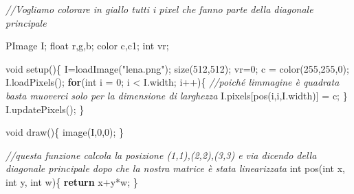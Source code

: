 \documentclass[
]{article}
\newenvironment{Shaded}{}{}
\newcommand{\CommentTok}[1]{\textcolor[rgb]{0.38,0.63,0.69}{\textit{#1}}}
\newcommand{\ControlFlowTok}[1]{\textcolor[rgb]{0.00,0.44,0.13}{\textbf{#1}}}
\newcommand{\DataTypeTok}[1]{\textcolor[rgb]{0.56,0.13,0.00}{#1}}
\newcommand{\DecValTok}[1]{\textcolor[rgb]{0.25,0.63,0.44}{#1}}
\newcommand{\FunctionTok}[1]{\textcolor[rgb]{0.02,0.16,0.49}{#1}}
\newcommand{\NormalTok}[1]{#1}
\newcommand{\OperatorTok}[1]{\textcolor[rgb]{0.40,0.40,0.40}{#1}}
\newcommand{\StringTok}[1]{\textcolor[rgb]{0.25,0.44,0.63}{#1}}
\begin{document}
\begin{Shaded}
\begin{Highlighting}[]
\CommentTok{//Vogliamo colorare in giallo tutti i pixel che fanno parte della diagonale principale}

\NormalTok{PImage I}\OperatorTok{;}
\DataTypeTok{float}\NormalTok{ r}\OperatorTok{,}\NormalTok{g}\OperatorTok{,}\NormalTok{b}\OperatorTok{;}
\NormalTok{color c}\OperatorTok{,}\NormalTok{c1}\OperatorTok{;}
\DataTypeTok{int}\NormalTok{ vr}\OperatorTok{;}

\DataTypeTok{void} \FunctionTok{setup}\OperatorTok{()\{}
\NormalTok{  I}\OperatorTok{=}\FunctionTok{loadImage}\OperatorTok{(}\StringTok{"lena.png"}\OperatorTok{);}
  \FunctionTok{size}\OperatorTok{(}\DecValTok{512}\OperatorTok{,}\DecValTok{512}\OperatorTok{);}
\NormalTok{  vr}\OperatorTok{=}\DecValTok{0}\OperatorTok{;}
\NormalTok{  c }\OperatorTok{=} \FunctionTok{color}\OperatorTok{(}\DecValTok{255}\OperatorTok{,}\DecValTok{255}\OperatorTok{,}\DecValTok{0}\OperatorTok{);}
\NormalTok{  I}\OperatorTok{.}\FunctionTok{loadPixels}\OperatorTok{();}
  \ControlFlowTok{for}\OperatorTok{(}\DataTypeTok{int}\NormalTok{ i }\OperatorTok{=} \DecValTok{0}\OperatorTok{;}\NormalTok{ i }\OperatorTok{\textless{}}\NormalTok{ I}\OperatorTok{.}\FunctionTok{width}\OperatorTok{;}\NormalTok{ i}\OperatorTok{++)\{} \CommentTok{//poiché l\textquotesingle{}immagine è quadrata basta muoverci solo per la dimensione di larghezza}
\NormalTok{    I}\OperatorTok{.}\FunctionTok{pixels}\OperatorTok{[}\FunctionTok{pos}\OperatorTok{(}\NormalTok{i}\OperatorTok{,}\NormalTok{i}\OperatorTok{,}\NormalTok{I}\OperatorTok{.}\FunctionTok{width}\OperatorTok{)]} \OperatorTok{=}\NormalTok{ c}\OperatorTok{;}
  \OperatorTok{\}}
\NormalTok{  I}\OperatorTok{.}\FunctionTok{updatePixels}\OperatorTok{();}
\OperatorTok{\}}

\DataTypeTok{void} \FunctionTok{draw}\OperatorTok{()\{}
  \FunctionTok{image}\OperatorTok{(}\NormalTok{I}\OperatorTok{,}\DecValTok{0}\OperatorTok{,}\DecValTok{0}\OperatorTok{);}
\OperatorTok{\}}

\CommentTok{//questa funzione calcola la posizione (1,1),(2,2),(3,3) e via dicendo della diagonale principale dopo che la nostra matrice è stata linearizzata}
\DataTypeTok{int} \FunctionTok{pos}\OperatorTok{(}\DataTypeTok{int}\NormalTok{ x}\OperatorTok{,} \DataTypeTok{int}\NormalTok{ y}\OperatorTok{,} \DataTypeTok{int}\NormalTok{ w}\OperatorTok{)\{}
  \ControlFlowTok{return}\NormalTok{ x}\OperatorTok{+}\NormalTok{y}\OperatorTok{*}\NormalTok{w}\OperatorTok{;}
\OperatorTok{\}}
\end{Highlighting}
\end{Shaded}
\end{document}
